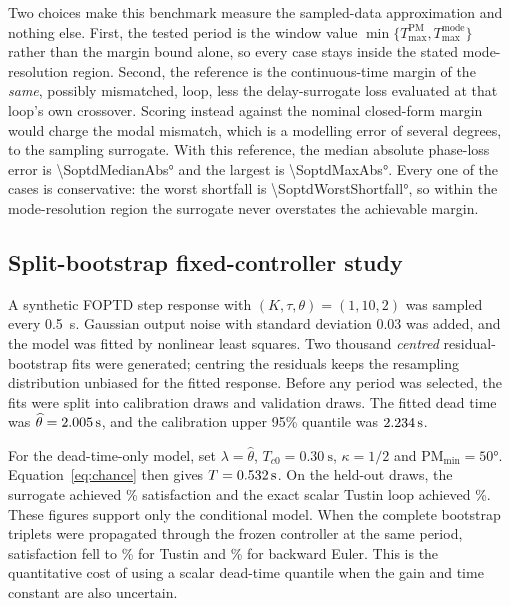 \documentclass[a4paper,fleqn]{cas-sc}
\theoremstyle{remark}
\newcommand{\Tmax}{T_{\max}}
\begin{document}
Two choices make this benchmark measure the sampled-data approximation and nothing else. First, the tested period is the window value $\min\{\Tmax^{\mathrm{PM}},\Tmax^{\mathrm{mode}}\}$ rather than the margin bound alone, so every case stays inside the stated mode-resolution region. Second, the reference is the continuous-time margin of the \emph{same}, possibly mismatched, loop, less the delay-surrogate loss evaluated at that loop's own crossover. Scoring instead against the nominal closed-form margin would charge the modal mismatch, which is a modelling error of several degrees, to the sampling surrogate. With this reference, the median absolute phase-loss error is \ang{\SoptdMedianAbs} and the largest is \ang{\SoptdMaxAbs}. Every one of the \SoptdN{} cases is conservative: the worst shortfall is \ang{\SoptdWorstShortfall}, so within the mode-resolution region the surrogate never overstates the achievable margin.



\subsection{Split-bootstrap fixed-controller study}
A synthetic FOPTD step response with $(K,\tau,\theta)=(1,10,2)$ was sampled every \SI{0.5}{\second}. Gaussian output noise with standard deviation 0.03 was added, and the model was fitted by nonlinear least squares. Two thousand \emph{centred} residual-bootstrap fits were generated; centring the residuals keeps the resampling distribution unbiased for the fitted response. Before any period was selected, the fits were split into \BootNCal{} calibration draws and \BootNVal{} validation draws. The fitted dead time was $\widehat\theta=2.005\,\mathrm{s}$, and the calibration upper 95\% quantile was $2.234\,\mathrm{s}$.

For the dead-time-only model, set $\lambda=\widehat\theta$, $T_{c0}=\SI{0.30}{\second}$, $\kappa=1/2$ and $\mathrm{PM}_{\min}=\ang{50}$. Equation~\eqref{eq:chance} then gives $T=0.532\,\mathrm{s}$. On the held-out draws, the surrogate achieved \BootCovSurVal\% satisfaction and the exact scalar Tustin loop achieved \BootCovScalarTuVal\%. These figures support only the conditional model. When the complete bootstrap triplets were propagated through the frozen controller at the same period, satisfaction fell to \BootCovJointTuAtScalar\% for Tustin and \BootCovJointBEAtScalar\% for backward Euler. This is the quantitative cost of using a scalar dead-time quantile when the gain and time constant are also uncertain.
\end{document}
